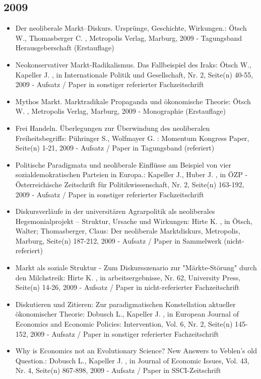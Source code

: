  \subsection{2009} 
 \begin{itemize} 
	 \item Der neoliberale Markt–Diskurs. Ursprünge, Geschichte, Wirkungen.: Ötsch W., Thomasberger C. , Metropolis Verlag, Marburg, 2009 - Tagungsband Herausgeberschaft (Erstauflage)
	 \item Neokonservativer Markt-Radikalismus. Das Fallbeispiel des Iraks: Ötsch W., Kapeller J. , in Internationale Politik und Gesellschaft, Nr. 2, Seite(n) 40-55, 2009 - Aufsatz / Paper in sonstiger referierter Fachzeitschrift
	 \item Mythos Markt. Marktradikale Propaganda und ökonomische Theorie: Ötsch W. , Metropolis Verlag, Marburg, 2009 - Monographie (Erstauflage)
	 \item Frei Handeln. Überlegungen zur Überwindung des neoliberalen Freiheitsbegriffs: Pühringer S., Wolfmayer G. : Momentum Kongress Paper, Seite(n) 1-21, 2009 - Aufsatz / Paper in Tagungsband (referiert)
	 \item Politische Paradigmata und neoliberale Einflüsse am Beispiel von vier sozialdemokratischen Parteien in Europa.: Kapeller J., Huber J. , in ÖZP - Österreichische Zeitschrift für Politikwissenschaft, Nr. 2, Seite(n) 163-192, 2009 - Aufsatz / Paper in sonstiger referierter Fachzeitschrift
	 \item Diskursverläufe in der universitären Agrarpolitik als neoliberales Hegemonialprojekt – Struktur, Ursache und Wirkungen: Hirte K. , in Ötsch, Walter; Thomasberger, Claus: Der neoliberale Marktdiskurs, Metropolis, Marburg, Seite(n) 187-212, 2009 - Aufsatz / Paper in Sammelwerk (nicht-referiert)
	 \item Markt als soziale Struktur - Zum Diskursszenario zur "Märkte-Störung" durch den Milchstreik: Hirte K. , in arbeitsergebnisse, Nr. 62, University Press, Seite(n) 14-26, 2009 - Aufsatz / Paper in nicht-referierter Fachzeitschrift
	 \item Diskutieren und Zitieren: Zur paradigmatischen Konstellation aktueller ökonomischer Theorie: Dobusch L., Kapeller J. , in European Journal of Economics and Economic Policies: Intervention, Vol. 6, Nr. 2, Seite(n) 145-152, 2009 - Aufsatz / Paper in sonstiger referierter Fachzeitschrift
	 \item Why is Economics not an Evolutionary Science? New Answers to Veblen's old Question.: Dobusch L., Kapeller J. , in Journal of Economic Issues, Vol. 43, Nr. 4, Seite(n) 867-898, 2009 - Aufsatz / Paper in SSCI-Zeitschrift
\end{itemize}